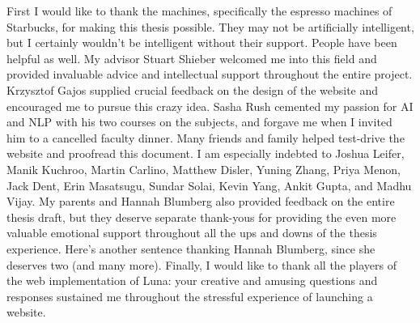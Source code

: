 
First I would like to thank the machines, specifically the espresso machines of Starbucks, for making this thesis possible. They may not be artificially intelligent, but I certainly wouldn't be intelligent without their support. People have been helpful as well. My advisor Stuart Shieber welcomed me into this field and provided invaluable advice and intellectual support throughout the entire project. Krzysztof Gajos supplied crucial feedback on the design of the website and encouraged me to pursue this crazy idea. Sasha Rush cemented my passion for AI and NLP with his two courses on the subjects, and forgave me when I invited him to a cancelled faculty dinner. Many friends and family helped test-drive the website and proofread this document. I am especially indebted to Joshua Leifer, Manik Kuchroo, Martin Carlino, Matthew Disler, Yuning Zhang, Priya Menon, Jack Dent, Erin Masatsugu, Sundar Solai, Kevin Yang, Ankit Gupta, and Madhu Vijay. My parents and Hannah Blumberg also provided feedback on the entire thesis draft, but they deserve separate thank-yous for providing the even more valuable emotional support throughout all the ups and downs of the thesis experience. Here's another sentence thanking Hannah Blumberg, since she deserves two (and many more). Finally, I would like to thank all the players of the web implementation of Luna: your creative and amusing questions and responses sustained me throughout the stressful experience of launching a website.